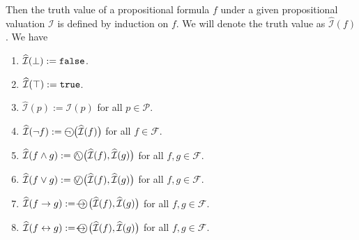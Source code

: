 \begin{table}[!ht]
  \centering
{}
  \caption{Interpretation of the propositional operators.}
  \label{tab:aussagen-logik}
\end{table}
Then the truth value of a propositional formula $f$ under a given propositional valuation $\mathcal{I}$ is
defined by induction on $f$.  We will denote the truth value as
$\widehat{\mathcal{I}}(f)$ .  We have
\begin{enumerate}
\item $\widehat{\mathcal{I}}(\bot) := \texttt{false}$.
\item $\widehat{\mathcal{I}}(\top) := \texttt{true}$.
\item $\widehat{\mathcal{I}}(p) := \mathcal{I}(p)$ for all $p \in \mathcal{P}$.
\item $\widehat{\mathcal{I}}(\neg f) := \circneg\;\bigl(\widehat{\mathcal{I}}(f)\bigr)$ for all $f \in \mathcal{F}$.
\item $\widehat{\mathcal{I}}(f \wedge g) := \circwedge\;\bigl(\widehat{\mathcal{I}}(f), \widehat{\mathcal{I}}(g)\bigr)$ 
      for all $f, g \in \mathcal{F}$.
\item $\widehat{\mathcal{I}}(f \vee g) := \circvee\;\bigl(\widehat{\mathcal{I}}(f), \widehat{\mathcal{I}}(g)\bigr)$ 
      for all $f, g \in \mathcal{F}$.
\item $\widehat{\mathcal{I}}(f \rightarrow g) := \circright\;\bigl(\widehat{\mathcal{I}}(f), \widehat{\mathcal{I}}(g)\bigr)$ 
      for all $f, g \in \mathcal{F}$.
\item $\widehat{\mathcal{I}}(f \leftrightarrow g) := \circleftright\;\bigl(\widehat{\mathcal{I}}(f), \widehat{\mathcal{I}}(g)\bigr)$ 
      for all $f, g \in \mathcal{F}$.
\end{enumerate}
